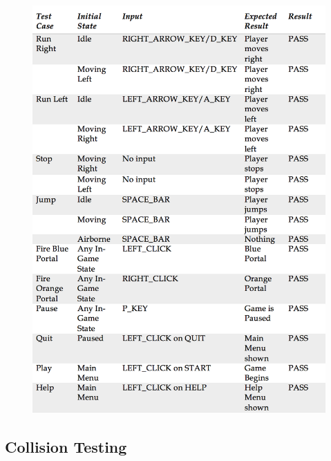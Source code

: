 \documentclass[12pt, titlepage]{article}
\begin{document}
\begin{figure}[H]
   \centering
   \includegraphics[scale=0.8]{Table1.png} %
   \label{fig:table1}
\end{figure}


\subsection{Collision Testing}
\end{document}
